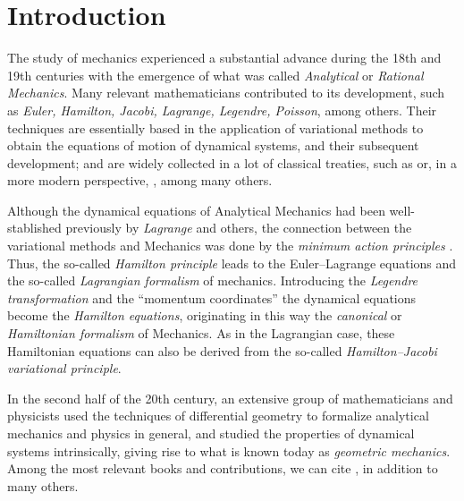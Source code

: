 \documentclass[12pt]{report}
\begin{document}


\chapter{Introduction}


\setcounter{page}{1}


The study of mechanics experienced a substantial advance during 
the 18th and 19th centuries with the emergence of what was called 
{\sl Analytical} or {\sl Rational Mechanics}.
Many relevant mathematicians contributed to its development, 
such as {\it Euler, Hamilton, Jacobi, Lagrange, Legendre, Poisson}, among others.
Their techniques are essentially based in the application of variational methods 
to obtain the equations of motion of dynamical systems, and their subsequent development;
and are widely collected in a lot of classical treaties, such as
\cite{FLS-2005,Ga-70,GPS-01,KB-2004,La-70,LL-76,Wh-37}
or, in a more modern perspective, \cite{Arovas2014,De-2010,JS-98,Le-2014,Sch-2005,SM-74,Wo-2009},
among many others.

Although the dynamical equations of Analytical Mechanics had been well-stablished
previously by {\it Lagrange} and others,
the connection between the variational methods and Mechanics was done 
by the {\sl minimum action principles}
\cite{Bl-81,Bli,Els,GF-63,La-70,Le-2014}. Thus, the so-called
{\sl Hamilton principle} leads to the Euler--Lagrange equations
and  the so-called {\sl Lagrangian formalism} of mechanics.
Introducing the {\sl Legendre transformation} and the ``momentum coordinates''
the dynamical equations become the {\sl Hamilton equations},
originating in this way the {\sl canonical} or {\sl Hamiltonian formalism}
of Mechanics. As in the Lagrangian case, these Hamiltonian equations
can also be derived from the so-called {\sl Hamilton--Jacobi variational principle}.

In the second half of the 20th century, 
an extensive group of mathematicians and physicists used 
the techniques of differential geometry to formalize analytical mechanics
and physics in general,
and studied the properties of dynamical systems intrinsically,
giving rise to what is known today as {\sl geometric mechanics}.
Among the most relevant books and contributions, we can cite
\cite{AM-78,Ar-89,CIMM-2015,CDW-87,Go-69,GS-77,Holm-2008,Ib-96,klein,Lewis,LM-sgam,Li-75,MS-98,MR-99,Ol-02,RTSST-2005,Sch-2005,So-ssd,We-77},
in addition to many others.
\end{document}
